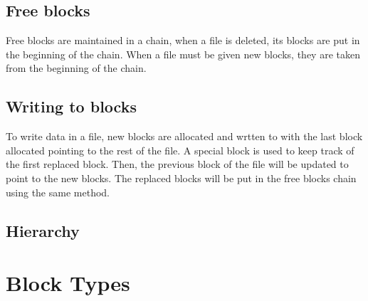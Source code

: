 \documentclass{article}
\begin{document}
\subsection{Free blocks}
Free blocks are maintained in a chain, when a file is deleted, its blocks are put in the beginning of the chain. When a file must be given new blocks, they are taken from the beginning of the chain.
\subsection{Writing to blocks} 
To write data in a file, new blocks are allocated and wrtten to with the last block allocated pointing to the rest of the file. A special block is used to keep track of the first replaced block.
Then, the previous block of the file will be updated to point to the new blocks.
The replaced blocks will be put in the free blocks chain using the same method.

\subsection{Hierarchy}


\section{Block Types}
\end{document}

